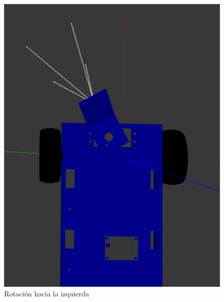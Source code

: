 \begin{figure}[ht!]
	\centering
	\begin{minipage}{0.35\linewidth}
		\centering
		\includegraphics[width=\linewidth]{figs/cap6/rotizq.png}
		\caption*{\centering Rotación hacia la izquierda} 
	\end{minipage}
	\hspace{2cm}
	\begin{minipage}{0.35\linewidth}
		\centering

\end{minipage}
\end{figure}
